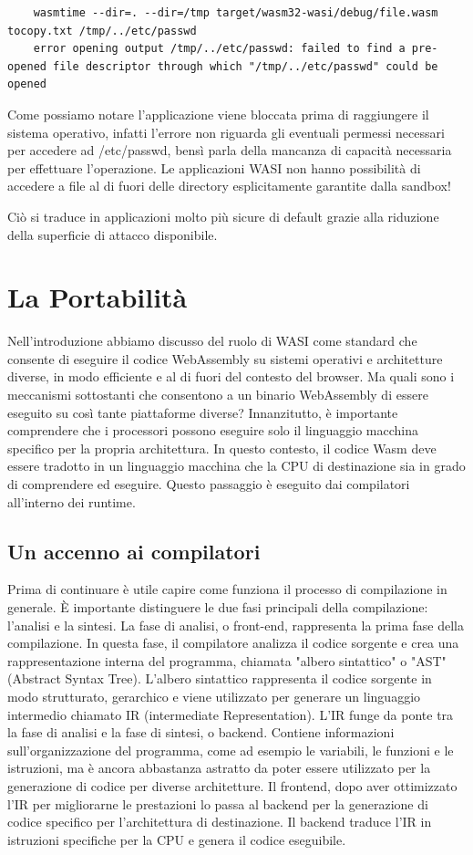 \begin{lstlisting}
    wasmtime --dir=. --dir=/tmp target/wasm32-wasi/debug/file.wasm tocopy.txt /tmp/../etc/passwd
    error opening output /tmp/../etc/passwd: failed to find a pre-opened file descriptor through which "/tmp/../etc/passwd" could be opened
\end{lstlisting}

Come possiamo notare l'applicazione viene bloccata prima di raggiungere il sistema operativo, infatti l'errore non
riguarda gli eventuali permessi necessari per accedere ad /etc/passwd, bensì parla della mancanza di capacità necessaria
per effettuare l'operazione. Le applicazioni WASI non hanno possibilità di accedere a file al di fuori delle directory
esplicitamente garantite dalla sandbox!

Ciò si traduce in applicazioni molto più sicure di default grazie alla riduzione della superficie di attacco
disponibile.

\section{La Portabilità}
Nell'introduzione abbiamo discusso del ruolo di WASI come standard che consente di eseguire il codice WebAssembly su
sistemi operativi e architetture diverse, in modo efficiente e al di fuori del contesto del browser. Ma quali sono i
meccanismi sottostanti che consentono a un binario WebAssembly di essere eseguito su così tante piattaforme diverse?
Innanzitutto, è importante comprendere che i processori possono eseguire solo il linguaggio macchina specifico per la
propria architettura. In questo contesto, il codice Wasm deve essere tradotto in un linguaggio macchina che la CPU di
destinazione sia in grado di comprendere ed eseguire. Questo passaggio è eseguito dai compilatori all'interno dei
runtime.

\subsection{Un accenno ai compilatori}
Prima di continuare è utile capire come funziona il processo di compilazione in generale\cite{compilers-foundamentals}.
È importante distinguere le due fasi principali della compilazione: l'analisi e la sintesi. La fase di analisi, o
front-end, rappresenta la prima fase della compilazione. In questa fase, il compilatore analizza il codice sorgente e
crea una rappresentazione interna del programma, chiamata "albero sintattico" o "AST" (Abstract Syntax Tree). L'albero
sintattico rappresenta il codice sorgente in modo strutturato, gerarchico e viene utilizzato per generare un linguaggio
intermedio chiamato IR (intermediate Representation). L'IR funge da ponte tra la fase di analisi e la fase di sintesi, o
backend. Contiene informazioni sull'organizzazione del programma, come ad esempio le variabili, le funzioni e le
istruzioni, ma è ancora abbastanza astratto da poter essere utilizzato per la generazione di codice per diverse
architetture. Il frontend, dopo aver ottimizzato l'IR per migliorarne le prestazioni lo passa al backend per la
generazione di codice specifico per l'architettura di destinazione. Il backend traduce l'IR in istruzioni specifiche per
la CPU e genera il codice eseguibile.

